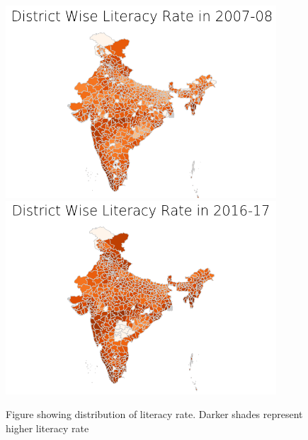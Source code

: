 \documentclass[twoside]{article}
\begin{document}
\begin{figure}[h]
    \centering
    \includegraphics[width=0.9\textwidth]{Literacy_07_08.png}
    \includegraphics[width=0.9\textwidth]{Literacy_16_17.png}
    \caption{Figure showing distribution of literacy rate. Darker shades represent higher literacy rate}
    \label{fig:literacy_heatmap}
\end{figure}
\end{document}
